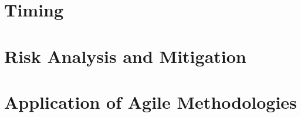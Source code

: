 
\section{Timing}



\section{Risk Analysis and Mitigation}



\section{Application of Agile Methodologies} \label{Agile}